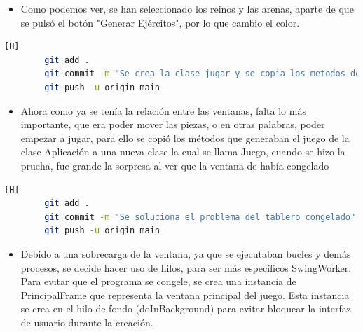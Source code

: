 \documentclass{article}
\begin{document}
	\begin{itemize}	
		\item Como podemos ver, se han seleccionado los reinos y las arenas, aparte de que se pulsó el botón "Generar Ejércitos", por lo que cambio el color.
	\end{itemize}
















	\begin{lstlisting}[language=bash,caption={Commit: b0ebb059321682a27d2f21c912ae36be7d544d08 }][H]
		git add .
		git commit -m "Se crea la clase jugar y se copia los metodos de la clase Aplicacion modifcandolo en lago, pero el juego se congela"			
		git push -u origin main
	\end{lstlisting}
	
	\begin{itemize}
	\item Ahora como ya se tenía la relación entre las ventanas, falta lo más importante, que era poder mover las piezas, o en otras palabras, poder empezar a jugar, para ello se copió los métodos que generaban el juego de la clase Aplicación a una nueva clase la cual se llama Juego, cuando se hizo la prueha, fue grande la sorpresa al ver que la ventana de había congelado
	\end{itemize}









	
	\begin{lstlisting}[language=bash,caption={Commit: 1026560a06a7659c2d6af35188a74a8c46d75c44 }][H]
		git add .
		git commit -m "Se soluciona el problema del tablero congelado"			
		git push -u origin main
	\end{lstlisting}
	
	
	\begin{itemize}
	\item Debido a una sobrecarga de la ventana, ya que se ejecutaban bucles y demás procesos, se decide hacer uso de hilos, para ser más específicos SwingWorker. Para evitar que el programa se congele, se crea una instancia de PrincipalFrame que representa la ventana principal del juego. Esta instancia se crea en el hilo de fondo (doInBackground) para evitar bloquear la interfaz de usuario durante la creación. 
	\end{itemize}
\end{document}
